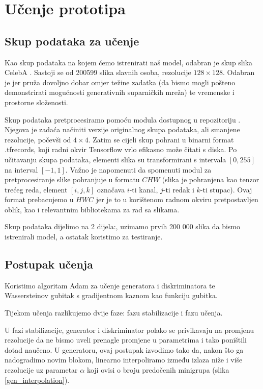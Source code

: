\section{Učenje prototipa}

\subsection{Skup podataka za učenje}
Kao skup podataka na kojem ćemo istrenirati naš model, odabran je skup slika CelebA \citep{liu2015faceattributes}. Sastoji se od 200599 slika slavnih osoba, rezolucije $128 \times 128$. Odabran je jer pruža dovoljno dobar omjer težine zadatka (da bismo mogli pošteno demonstrirati mogućnosti generativnih suparničkih mreža) te vremenske i prostorne složenosti. 

Skup podataka pretprocesiramo pomoću modula dostupnog u repozitoriju \citep{progressive_gan_git}. Njegova je zadaća načiniti verzije originalnog skupa podataka, ali smanjene rezolucije, počevši od $4 \times 4$. Zatim se cijeli skup pohrani u binarni format .tfrecords, koji radni okvir Tensorflow vrlo efikasno može čitati s diska. Po učitavanju skupa podataka, elementi slika su transformirani s intervala $[0, 255]$  na interval $[-1, 1]$. Važno je napomenuti da spomenuti modul za pretprocesiranje slike pohranjuje u formatu $CHW$ (slika je pohranjena kao tenzor trećeg reda, element $[i, j, k]$ označava $i$-ti kanal, $j$-ti redak i $k$-ti stupac). Ovaj format prebacujemo u $HWC$ jer je to u korištenom radnom okviru pretpostavljen oblik, kao i relevantnim bibliotekama za rad sa slikama.

Skup podataka dijelimo na 2 dijela:, uzimamo prvih 200 000 slika da bismo istrenirali model, a ostatak koristimo za testiranje.

\subsection{Postupak učenja}
Koristimo algoritam Adam za učenje generatora i diskriminatora te Wassersteinov gubitak s gradijentnom kaznom kao funkciju gubitka. 

Tijekom učenja razlikujemo dvije faze: fazu stabilizacije i fazu učenja.

U fazi stabilizacije, generator i diskriminator polako se privikavaju na promjenu rezolucije da ne bismo uveli prenagle promjene u parametrima i tako poništili dotad naučeno. U generatoru, ovaj postupak izvodimo tako da, nakon što ga nadogradimo novim blokom, linearno interpoliramo između izlaza niže i više rezolucije uz parametar $\alpha$ koji ovisi o broju predočenih minigrupa (slika \ref{gen_interpolation}). 

